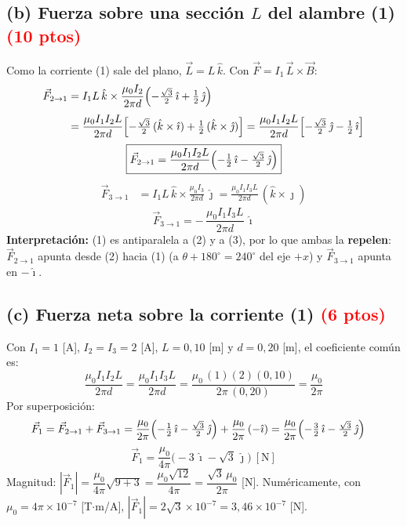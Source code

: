 \documentclass[12pt,letterpaper]{article}
\newcommand{\ptos}[1]{\textcolor{red}{\textbf{(#1 ptos)}}}
\begin{document}
\subsection*{(b) Fuerza sobre una secci\'on $L$ del alambre (1) \ptos{10}}

\noindent Como la corriente (1) sale del plano, $\vec{L} = L\,\hat{k}$. Con
$\vec{F} = I_1\,\vec{L}\times\vec{B}$:
\begin{align*}
    \vec{F}_{2\to1} &= I_1 L\,\hat{k}\times\frac{\mu_0 I_2}{2\pi d}
                       \Bigl(-\tfrac{\sqrt{3}}{2}\,\hat{\imath} + \tfrac{1}{2}\,\hat{\jmath}\Bigr)\\[3pt]
    &= \frac{\mu_0 I_1 I_2 L}{2\pi d}
       \Bigl[-\tfrac{\sqrt{3}}{2}\,(\hat{k}\times\hat{\imath}) + \tfrac{1}{2}\,(\hat{k}\times\hat{\jmath})\Bigr]
     = \frac{\mu_0 I_1 I_2 L}{2\pi d}
       \Bigl[-\tfrac{\sqrt{3}}{2}\,\hat{\jmath} - \tfrac{1}{2}\,\hat{\imath}\Bigr]
\end{align*}
\[
    \boxed{\vec{F}_{2\to1} = \frac{\mu_0 I_1 I_2 L}{2\pi d}
    \Bigl(-\tfrac{1}{2}\,\hat{\imath} - \tfrac{\sqrt{3}}{2}\,\hat{\jmath}\Bigr)}
\]
\begin{align*}
    \vec{F}_{3\to1} &= I_1 L\,\hat{k}\times\frac{\mu_0 I_3}{2\pi d}\,\hat{\jmath}
    = \frac{\mu_0 I_1 I_3 L}{2\pi d}\,(\hat{k}\times\hat{\jmath})
\end{align*}
\[
    \boxed{\vec{F}_{3\to1} = -\,\frac{\mu_0 I_1 I_3 L}{2\pi d}\,\hat{\imath}}
\]
\noindent\textbf{Interpretaci\'on:} (1) es antiparalela a (2) y a (3), por lo que ambas la
\textbf{repelen}: $\vec{F}_{2\to1}$ apunta desde (2) hacia (1) (a
$\theta + 180^\circ = 240^\circ$ del eje $+x$) y $\vec{F}_{3\to1}$ apunta en $-\hat{\imath}$.

\subsection*{(c) Fuerza neta sobre la corriente (1) \ptos{6}}

\noindent Con $I_1 = 1$ [A], $I_2 = I_3 = 2$ [A], $L = 0{,}10$ [m] y $d = 0{,}20$ [m], el coeficiente
com\'un es:
\[
    \frac{\mu_0 I_1 I_2 L}{2\pi d} = \frac{\mu_0 I_1 I_3 L}{2\pi d}
    = \frac{\mu_0\,(1)(2)(0{,}10)}{2\pi\,(0{,}20)} = \frac{\mu_0}{2\pi}
\]
Por superposici\'on:
\begin{align*}
    \vec{F}_1 = \vec{F}_{2\to1} + \vec{F}_{3\to1}
    &= \frac{\mu_0}{2\pi}\Bigl(-\tfrac{1}{2}\,\hat{\imath} - \tfrac{\sqrt{3}}{2}\,\hat{\jmath}\Bigr)
       + \frac{\mu_0}{2\pi}\,(-\hat{\imath})
     = \frac{\mu_0}{2\pi}\Bigl(-\tfrac{3}{2}\,\hat{\imath} - \tfrac{\sqrt{3}}{2}\,\hat{\jmath}\Bigr)
\end{align*}
\[
    \boxed{\vec{F}_1 = \frac{\mu_0}{4\pi}\bigl(-3\,\hat{\imath} - \sqrt{3}\,\hat{\jmath}\bigr)\ [\text{N}]}
\]
\noindent Magnitud: $|\vec{F}_1| = \dfrac{\mu_0}{4\pi}\sqrt{9+3} = \dfrac{\mu_0\sqrt{12}}{4\pi}
= \dfrac{\sqrt{3}\,\mu_0}{2\pi}$ [N]. Num\'ericamente, con $\mu_0 = 4\pi\times10^{-7}$
[T$\cdot$m/A], $|\vec{F}_1| = 2\sqrt{3}\times10^{-7} = 3{,}46\times10^{-7}$ [N].
\end{document}
